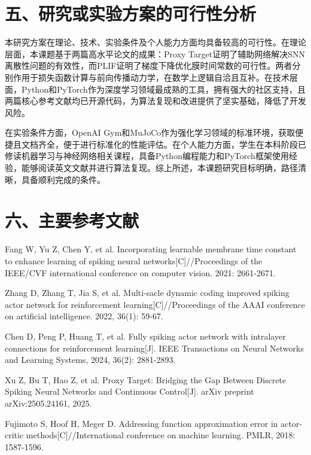 \documentclass[UTF8,12pt,a4paper]{ctexart}
\begin{document}
\section*{五、研究或实验方案的可行性分析}
本研究方案在理论、技术、实验条件及个人能力方面均具备较高的可行性。在理论层面，本课题基于两篇高水平论文的成果：Proxy Target证明了辅助网络解决SNN离散性问题的有效性，而PLIF证明了梯度下降优化膜时间常数的可行性。两者分别作用于损失函数计算与前向传播动力学，在数学上逻辑自洽且互补。在技术层面，Python和PyTorch作为深度学习领域最成熟的工具，拥有强大的社区支持，且两篇核心参考文献均已开源代码，为算法复现和改进提供了坚实基础，降低了开发风险。

在实验条件方面，OpenAI Gym和MuJoCo作为强化学习领域的标准环境，获取便捷且文档齐全，便于进行标准化的性能评估。在个人能力方面，学生在本科阶段已修读机器学习与神经网络相关课程，具备Python编程能力和PyTorch框架使用经验，能够阅读英文文献并进行算法复现。综上所述，本课题研究目标明确，路径清晰，具备顺利完成的条件。

\section*{六、主要参考文献}
\begin{enumerate}[label={[\arabic*]},leftmargin=2.7em,itemsep=0.2em]
  \item Fang W, Yu Z, Chen Y, et al. Incorporating learnable membrane time constant to enhance learning of spiking neural networks[C]//Proceedings of the IEEE/CVF international conference on computer vision. 2021: 2661-2671.
  \item Zhang D, Zhang T, Jia S, et al. Multi-sacle dynamic coding improved spiking actor network for reinforcement learning[C]//Proceedings of the AAAI conference on artificial intelligence. 2022, 36(1): 59-67.
  \item Chen D, Peng P, Huang T, et al. Fully spiking actor network with intralayer connections for reinforcement learning[J]. IEEE Transactions on Neural Networks and Learning Systems, 2024, 36(2): 2881-2893.
  \item Xu Z, Bu T, Hao Z, et al. Proxy Target: Bridging the Gap Between Discrete Spiking Neural Networks and Continuous Control[J]. arXiv preprint arXiv:2505.24161, 2025.
  \item Fujimoto S, Hoof H, Meger D. Addressing function approximation error in actor-critic methods[C]//International conference on machine learning. PMLR, 2018: 1587-1596.
\end{enumerate}
\end{document}
